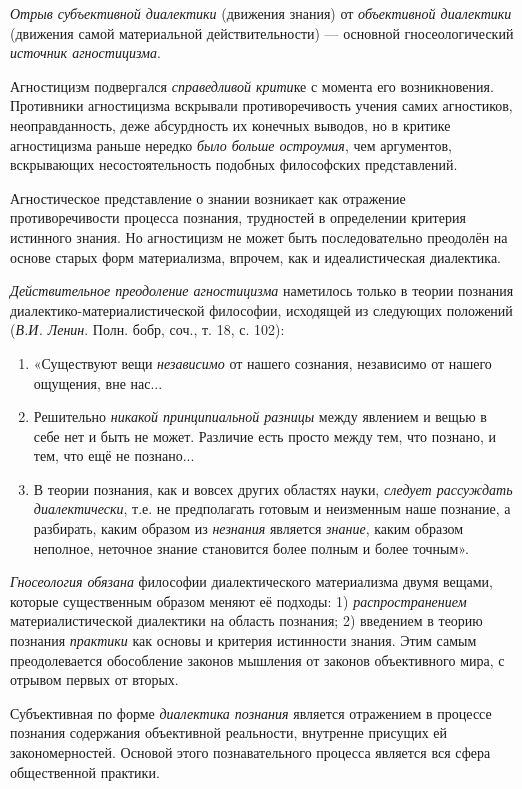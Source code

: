 \documentclass[a4paper,14pt,russian]{extreport}
\begin{document}
\emph{Отрыв субъективной диалектики} (движения знания) от \emph{объективной диалектики} (движения самой материальной действительности) --- основной гносеологический \emph{источник агностицизма}.

Агностицизм подвергался \emph{справедливой крити}ке с момента его возникновения. Противники агностицизма вскрывали противоречивость учения самих агностиков, неоправданность, деже абсурдность их конечных выводов, но в критике агностицизма раньше нередко \emph{было больше остроумия}, чем аргументов, вскрывающих несостоятельность подобных философских представлений.

Агностическое представление о знании возникает как отражение противоречивости процесса познания, трудностей в определении критерия истинного знания. Но агностицизм не может быть последовательно преодолён на основе старых форм материализма, впрочем, как и идеалистическая диалектика.

\emph{Действительное преодоление агностицизма} наметилось только в теории познания диалектико-материалистической философии, исходящей из следующих положений (\emph{В.И. Ленин}. Полн. бобр, соч., т. 18, с. 102):

\begin{enumerate}
\item «Существуют вещи \emph{независимо} от нашего сознания, независимо от нашего ощущения, вне нас...
\item Решительно \emph{никакой принципиальной разницы} между явлением и вещью в себе нет и быть не может. Различие есть просто между тем, что познано, и тем, что ещё не познано...
\item В теории познания, как и вовсех других областях науки, \emph{следует рассуждать диалектически}, т.е. не предполагать готовым и неизменным наше познание, а разбирать, каким образом из \emph{незнания} является \emph{знание}, каким образом неполное, неточное знание становится более полным и более точным».
\end{enumerate}

\emph{Гносеология обязана} философии диалектического материализма двумя вещами, которые существенным образом меняют её подходы: 1) \emph{распространением} материалистической диалектики на область познания; 2) введением в теорию познания \emph{практики} как основы и критерия истинности знания. Этим самым преодолевается обособление законов мышления от законов объективного мира, с отрывом первых от вторых.

Субъективная по форме \emph{диалектика познания} является отражением в процессе познания содержания объективной реальности, внутренне присущих ей закономерностей. Основой этого познавательного процесса является вся сфера общественной практики.
\end{document}
